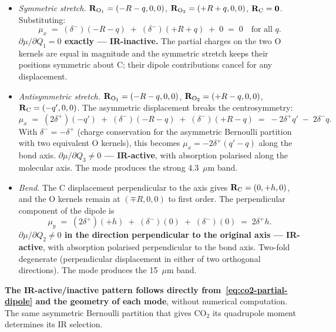 \begin{itemize}
\item \textit{Symmetric stretch.} $\mathbf{R}_{\rm O_1} = (-R-q, 0, 0)$, $\mathbf{R}_{\rm O_2} = (+R+q, 0, 0)$, $\mathbf{R}_{\rm C} = \mathbf{0}$. Substituting:
\[
\mu_x \;=\; (\delta^-)(-R-q) \;+\; (\delta^-)(+R+q) \;+\; 0 \;=\; 0 \quad \text{for all } q.
\]
\textbf{$\partial\mu/\partial Q_1 = 0$ exactly --- IR-inactive.} The partial charges on the two O kernels are equal in magnitude and the symmetric stretch keeps their positions symmetric about C; their dipole contributions cancel for any displacement.

\item \textit{Antisymmetric stretch.} $\mathbf{R}_{\rm O_1} = (-R-q, 0, 0)$, $\mathbf{R}_{\rm O_2} = (+R-q, 0, 0)$, $\mathbf{R}_{\rm C} = (-q', 0, 0)$. The asymmetric displacement breaks the centrosymmetry:
\[
\mu_x \;=\; (2\delta^+)(-q') \;+\; (\delta^-)(-R-q) \;+\; (\delta^-)(+R-q) \;=\; -2\delta^+ q' \;-\; 2\delta^- q.
\]
With $\delta^- = -\delta^+$ (charge conservation for the asymmetric Bernoulli partition with two equivalent O kernels), this becomes $\mu_x = -2\delta^+(q' - q)$ along the bond axis. \textbf{$\partial\mu/\partial Q_3 \neq 0$ --- IR-active}, with absorption polarised along the molecular axis. The mode produces the strong 4.3~$\mu$m band.

\item \textit{Bend.} The C displacement perpendicular to the axis gives $\mathbf{R}_{\rm C} = (0, +h, 0)$, and the O kernels remain at $(\mp R, 0, 0)$ to first order. The perpendicular component of the dipole is
\[
\mu_y \;=\; (2\delta^+)(+h) \;+\; (\delta^-)(0) \;+\; (\delta^-)(0) \;=\; 2\delta^+ h.
\]
\textbf{$\partial\mu/\partial Q_2 \neq 0$ in the direction perpendicular to the original axis --- IR-active}, with absorption polarised perpendicular to the bond axis. Two-fold degenerate (perpendicular displacement in either of two orthogonal directions). The mode produces the 15~$\mu$m band.
\end{itemize}

\textbf{The IR-active/inactive pattern follows directly from~\eqref{eq:co2-partial-dipole} and the geometry of each mode}, without numerical computation. The same asymmetric Bernoulli partition that gives CO$_2$ its quadrupole moment determines its IR selection.

